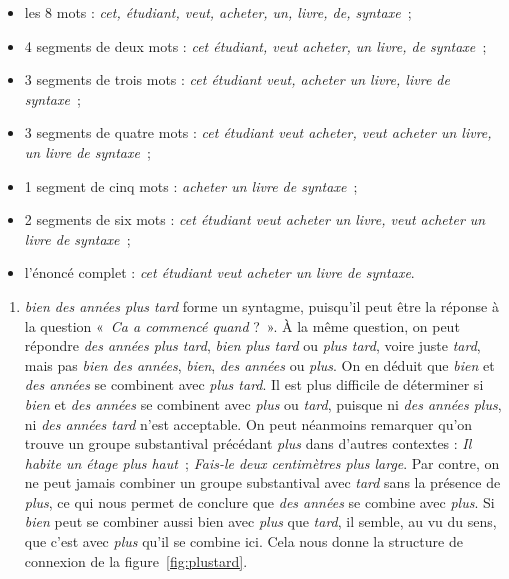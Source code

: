 {\begin{itemize}
\item les 8 mots : \textit{cet, étudiant, veut, acheter, un, livre, de, syntaxe~};
\item 4 segments de deux mots : \textit{cet étudiant, veut acheter, un livre, de syntaxe~};
\item 3 segments de trois mots : \textit{cet étudiant veut, acheter un livre, livre de syntaxe~};
\item 3 segments de quatre mots : \textit{cet étudiant veut acheter, veut acheter un livre, un livre de syntaxe~};
\item 1 segment de cinq mots : \textit{acheter un livre de syntaxe~};
\tcbbreak
\item 2 segments de six mots : \textit{cet étudiant veut acheter un livre, veut acheter un livre de syntaxe~};
\item l’énoncé complet : \textit{cet étudiant veut acheter un livre de syntaxe}.
\end{itemize}

\begin{enumerate}[label=\alph*.]
\item \textit{bien des années plus tard} forme un syntagme, puisqu’il peut être la réponse à la question «~\textit{Ca a commencé quand} ?~». À la même question, on peut répondre \textit{des années plus tard}, \textit{bien plus tard} ou \textit{plus tard}, voire juste \textit{tard}, mais pas \textit{bien des années}, \textit{bien}, \textit{des années} ou \textit{plus}. On en déduit que \textit{bien} et \textit{des années} se combinent avec \textit{plus tard}. Il est plus difficile de déterminer si \textit{bien} et \textit{des années} se combinent avec \textit{plus} ou \textit{tard}, puisque ni \textit{des années plus}, ni \textit{des années tard} n’est acceptable. On peut néanmoins remarquer qu’on trouve un groupe substantival précédant \textit{plus} dans d’autres contextes : \textit{Il habite un étage plus haut~}; \textit{Fais-le deux centimètres plus large}. Par contre, on ne peut jamais combiner un groupe substantival avec \textit{tard} sans la présence de \textit{plus}, ce qui nous permet de conclure que \textit{des années} se combine avec \textit{plus}. Si \textit{bien} peut se combiner aussi bien avec \textit{plus} que \textit{tard}, il semble, au vu du sens, que c’est avec \textit{plus} qu’il se combine ici. Cela nous donne la structure de connexion de la figure~\ref{fig:plustard}.
   
\begin{figure}[H]
\begin{center}
\end{center}
\end{figure}
\end{enumerate}}
